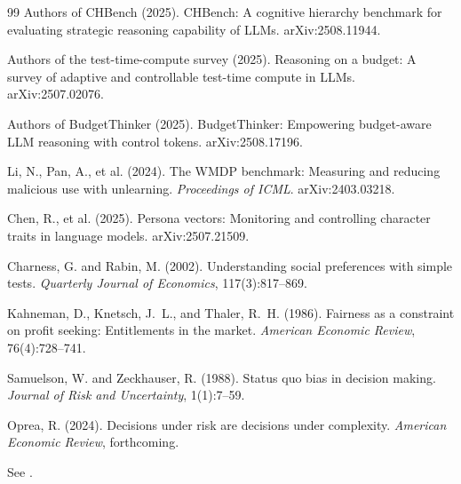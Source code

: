 \begin{thebibliography}{99}
Authors of CHBench (2025).
CHBench: A cognitive hierarchy benchmark for evaluating strategic
reasoning capability of LLMs.
arXiv:2508.11944.

Authors of the test-time-compute survey (2025).
Reasoning on a budget: A survey of adaptive and controllable test-time
compute in LLMs.
arXiv:2507.02076.

Authors of BudgetThinker (2025).
BudgetThinker: Empowering budget-aware LLM reasoning with control
tokens.
arXiv:2508.17196.

Li, N., Pan, A., et al. (2024).
The WMDP benchmark: Measuring and reducing malicious use with
unlearning.
\emph{Proceedings of ICML}. arXiv:2403.03218.

Chen, R., et al. (2025).
Persona vectors: Monitoring and controlling character traits in
language models.
arXiv:2507.21509.


Charness, G. and Rabin, M. (2002).
Understanding social preferences with simple tests.
\emph{Quarterly Journal of Economics}, 117(3):817--869.

Kahneman, D., Knetsch, J.~L., and Thaler, R.~H. (1986).
Fairness as a constraint on profit seeking: Entitlements in the market.
\emph{American Economic Review}, 76(4):728--741.

Samuelson, W. and Zeckhauser, R. (1988).
Status quo bias in decision making.
\emph{Journal of Risk and Uncertainty}, 1(1):7--59.

Oprea, R. (2024).
Decisions under risk are decisions under complexity.
\emph{American Economic Review}, forthcoming.

See \citet{coppinger1980incentives}.

\end{thebibliography}
